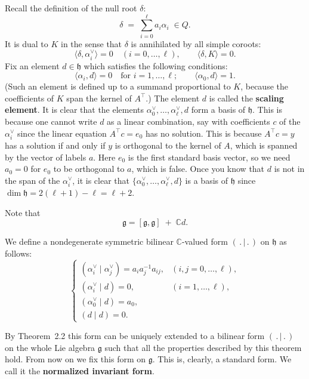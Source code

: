 \documentclass[12pt]{article}
\begin{document}
Recall the definition of the null root $\delta$:
\[
    \delta \;=\; \sum_{i=0}^\ell a_i \alpha_i \;\in Q.
\]
It is dual to $K$ in the sense that $\delta$ is annihilated by all simple coroots:
\[
    \langle \delta, \alpha_i^\vee \rangle = 0 \quad (i=0,\dots,\ell),
    \qquad
    \langle \delta, K \rangle = 0.
\]
Fix an element $d \in \mathfrak{h}$ which satisfies the following conditions:
\[
    \langle \alpha_i, d \rangle = 0 \quad \text{for } i=1,\dots,\ell; 
    \qquad 
    \langle \alpha_0, d \rangle = 1.
\]
(Such an element is defined up to a summand proportional to $K$, because the coefficients of $K$ span the kernel of $A^\top$.) The element $d$ is called the \textbf{scaling element}. 
It is clear that the elements $\alpha_0^\vee,\dots,\alpha_\ell^\vee,d$ form a basis of $\mathfrak{h}$. This is because one cannot write $d$ as a linear combination, say with coefficients $c$ of the $\alpha_i^\vee$ since the linear equation $A^\top c = e_0$ has no solution. This is because $A^\top c = y$ has a solution if and only if $y$ is orthogonal to the kernel of $A$, which is spanned by the vector of labels $a$. Here $e_0$ is the first standard basis vector, so we need $a_0=0$ for $e_0$ to be orthogonal to $a$, which is false. Once you know that $d$ is not in the span of the $\alpha_i^\vee$, it is clear that $\{\alpha_0^\vee,\dots,\alpha_\ell^\vee,d\}$ is a basis of $\mathfrak{h}$ since $\dim\mathfrak{h} = 2(\ell+1) - \ell = \ell+2$.



Note that
\[
    \mathfrak{g} = [\mathfrak{g},\mathfrak{g}] \;+\; \mathbb{C}d.
\]

We define a nondegenerate symmetric bilinear $\mathbb{C}$-valued form $(\,.\,|\,.\,)$ 
on $\mathfrak{h}$ as follows:
\begin{equation}
\label{eq:6.2.1}
\begin{cases}
(\alpha_i^\vee \mid \alpha_j^\vee) = a_i a_j^{-1} a_{ij}, & (i,j = 0,\dots,\ell), \\[6pt]
(\alpha_i^\vee \mid d) = 0, & (i=1,\dots,\ell), \\[6pt]
(\alpha_0^\vee \mid d) = a_0, \\[6pt]
(d \mid d) = 0.
\end{cases}
\end{equation}

By Theorem~2.2 this form can be uniquely extended to a bilinear form 
$(\,.\,|\,.\,)$ on the whole Lie algebra $\mathfrak{g}$ such that all the properties 
described by this theorem hold. From now on we fix this form on $\mathfrak{g}$. 
This is, clearly, a standard form. We call it the \textbf{normalized invariant form}.
\end{document}
